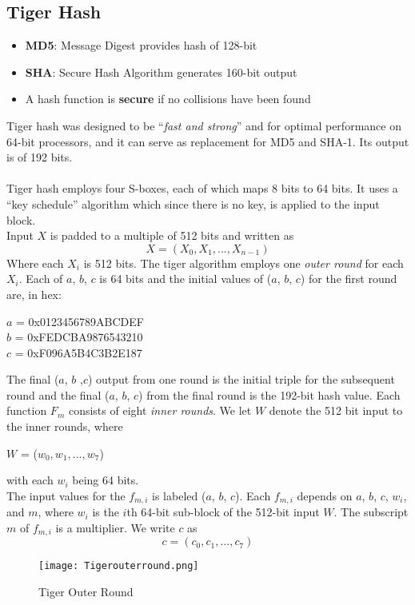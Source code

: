 \documentclass[a4paper]{article}
\begin{document}
\subsection{Tiger Hash}
\begin{itemize}
    \item \textbf{MD5}: Message Digest provides hash of 128-bit
    \item \textbf{SHA}: Secure Hash Algorithm generates 160-bit output
    \item A hash function is \textbf{secure} if no collisions have been found
\end{itemize}
Tiger hash was designed to be ``\textit{fast and strong}'' and for optimal performance on 64-bit processors, and it can serve as replacement for MD5 and SHA-1. Its output is of 192 bits.\\\\
Tiger hash employs four S-boxes, each of which maps 8 bits to 64 bits. It uses a ``key schedule'' algorithm  which since there is no key, is applied to the input block.\\
Input $X$ is padded to a multiple of 512 bits and written as
$$X = (X_0, X_1,...,X_{n-1})$$
Where each $X_i$ is 512 bits. The tiger algorithm employs one \textit{outer round} for each $X_i$. Each of $a$, $b$, $c$ is 64 bits and the initial values of ($a$, $b$, $c$) for the first round are, in hex:
\begin{center}
    $a$ = 0x0123456789ABCDEF\\
    $b$ = 0xFEDCBA9876543210\\
    $c$ = 0xF096A5B4C3B2E187\\
\end{center}
The final ($a$, $b$ ,$c$) output from one round is the initial triple for the subsequent round and the final ($a$, $b$, $c$) from the final round is the 192-bit hash value. Each function $F_m$ consists of eight \textit{inner rounds}. We let $W$ denote the 512 bit input to the inner rounds, where
\begin{center}
    $W$ = ($w_0, w_1,...,w_7$)
\end{center}
with each $w_i$ being 64 bits.\\
The input values for the $f_{m,i}$ is labeled ($a$, $b$, $c$). Each $f_{m,i}$ depends on $a$, $b$, $c$, $w_i$, and $m$, where $w_i$ is the $i$th 64-bit sub-block of the 512-bit input $W$. The subscript $m$ of $f_{m,i}$ is a multiplier. We write $c$ as
$$c = (c_0,c_1,...,c_7)$$
\begin{figure}[H]
    \centering
    \texttt{[image: Tigerouterround.png]}
    \caption{Tiger Outer Round}
\end{figure}
\end{document}

